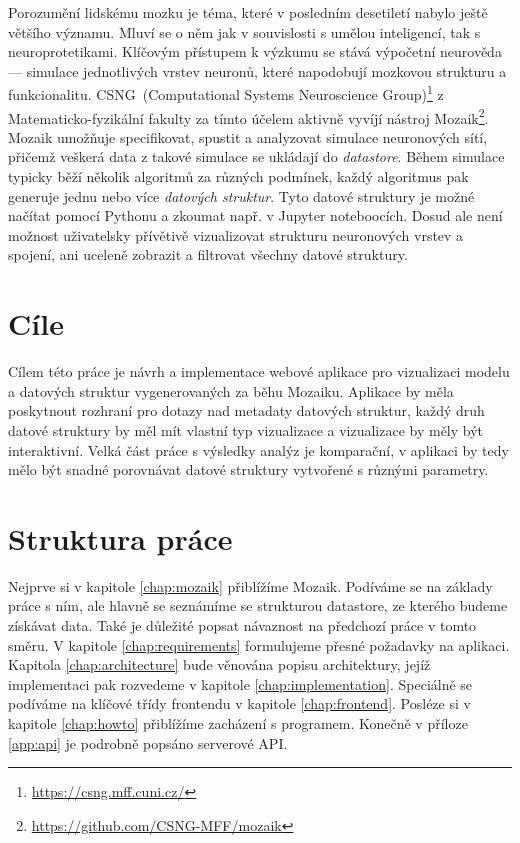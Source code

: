

Porozumění lidskému mozku je téma, které v posledním desetiletí nabylo ještě většího významu. Mluví se o něm jak v souvislosti s umělou inteligencí, tak s neuroprotetikami. Klíčovým přístupem k výzkumu se stává výpočetní neurověda --- simulace jednotlivých vrstev neuronů, které napodobují mozkovou strukturu a funkcionalitu. CSNG~(Computational Systems Neuroscience Group)\footnote{\url{https://csng.mff.cuni.cz/}} z Matematicko-fyzikální fakulty za tímto účelem aktivně vyvíjí nástroj Mozaik\footnote{\url{https://github.com/CSNG-MFF/mozaik}}. Mozaik umožňuje specifikovat, spustit a analyzovat simulace neuronových sítí, přičemž veškerá data z takové simulace se ukládají do \emph{datastore}. Během simulace typicky běží několik algoritmů za různých podmínek, každý algoritmus pak generuje jednu nebo více \emph{datových struktur}. Tyto datové struktury je možné načítat pomocí Pythonu a zkoumat např. v Jupyter noteboocích. Dosud ale není možnost uživatelsky přívětivě vizualizovat strukturu neuronových vrstev a spojení, ani uceleně zobrazit a filtrovat všechny datové struktury.

\section*{Cíle}

Cílem této práce je návrh a implementace webové aplikace pro vizualizaci modelu a datových struktur vygenerovaných za běhu Mozaiku. Aplikace by měla poskytnout rozhraní pro dotazy nad metadaty datových struktur, každý druh datové struktury by měl mít vlastní typ vizualizace a vizualizace by měly být interaktivní. Velká část práce s výsledky analýz je komparační, v aplikaci by tedy mělo být snadné porovnávat datové struktury vytvořené s různými parametry.

\section*{Struktura práce}

Nejprve si v kapitole \ref{chap:mozaik} přiblížíme Mozaik. Podíváme se na základy práce s ním, ale hlavně se seznámíme se strukturou datastore, ze kterého budeme získávat data. Také je důležité popsat návaznost na předchozí práce v tomto směru. V kapitole \ref{chap:requirements} formulujeme přesné požadavky na aplikaci. Kapitola \ref{chap:architecture} bude věnována popisu architektury, jejíž implementaci pak rozvedeme v kapitole \ref{chap:implementation}. Speciálně se podíváme na klíčové třídy frontendu v kapitole \ref{chap:frontend}. Posléze si v kapitole \ref{chap:howto} přiblížíme zacházení s programem. Konečně v příloze \ref{app:api} je podrobně popsáno serverové API.
